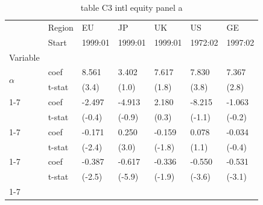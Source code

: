\begin{table}[htbp]
  \centering
  \caption{table C3 intl equity panel a}
  \label{tab:table_C3_intl_equity_panel_a}
  \begin{tabular}{lllllll}
\toprule
 & Region & EU & JP & UK & US & GE \\
 & Start & 1999:01 & 1999:01 & 1999:01 & 1972:02 & 1997:02 \\
Variable &  &  &  &  &  &  \\
\midrule
\multirow[t]{2}{*}{$\alpha$} & coef & 8.561 & 3.402 & 7.617 & 7.830 & 7.367 \\
 & t-stat & (3.4) & (1.0) & (1.8) & (3.8) & (2.8) \\
\cline{1-7}
\multirow[t]{2}{*}{$I_B$} & coef & -2.497 & -4.913 & 2.180 & -8.215 & -1.063 \\
 & t-stat & (-0.4) & (-0.9) & (0.3) & (-1.1) & (-0.2) \\
\cline{1-7}
\multirow[t]{2}{*}{$R^e_m$} & coef & -0.171 & 0.250 & -0.159 & 0.078 & -0.034 \\
 & t-stat & (-2.4) & (3.0) & (-1.8) & (1.1) & (-0.4) \\
\cline{1-7}
\multirow[t]{2}{*}{$I_B R^e_m$} & coef & -0.387 & -0.617 & -0.336 & -0.550 & -0.531 \\
 & t-stat & (-2.5) & (-5.9) & (-1.9) & (-3.6) & (-3.1) \\
\cline{1-7}
\bottomrule
\end{tabular}

\end{table}
